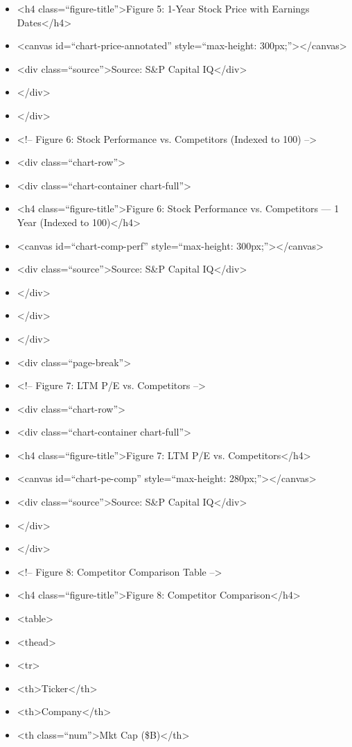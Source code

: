 \documentclass[11pt]{article}
\begin{document}
\begin{itemize}[leftmargin=*,itemsep=2pt,topsep=2pt]
\item {} <h4 class=``figure-title''>Figure 5: 1-Year Stock Price with Earnings Dates</h4>
\item {} <canvas id=``chart-price-annotated'' style=``max-height: 300px;''></canvas>
\item {} <div class=``source''>Source: S\&P Capital IQ</div>
\item {} </div>
\item {} </div>
\item {} <!-- Figure 6: Stock Performance vs. Competitors (Indexed to 100) -->
\item {} <div class=``chart-row''>
\item {} <div class=``chart-container chart-full''>
\item {} <h4 class=``figure-title''>Figure 6: Stock Performance vs. Competitors — 1 Year (Indexed to 100)</h4>
\item {} <canvas id=``chart-comp-perf'' style=``max-height: 300px;''></canvas>
\item {} <div class=``source''>Source: S\&P Capital IQ</div>
\item {} </div>
\item {} </div>
\item {} </div>
\item {} <div class=``page-break''>
\item {} <!-- Figure 7: LTM P/E vs. Competitors -->
\item {} <div class=``chart-row''>
\item {} <div class=``chart-container chart-full''>
\item {} <h4 class=``figure-title''>Figure 7: LTM P/E vs. Competitors</h4>
\item {} <canvas id=``chart-pe-comp'' style=``max-height: 280px;''></canvas>
\item {} <div class=``source''>Source: S\&P Capital IQ</div>
\item {} </div>
\item {} </div>
\item {} <!-- Figure 8: Competitor Comparison Table -->
\item {} <h4 class=``figure-title''>Figure 8: Competitor Comparison</h4>
\item {} <table>
\item {} <thead>
\item {} <tr>
\item {} <th>Ticker</th>
\item {} <th>Company</th>
\item {} <th class=``num''>Mkt Cap (\$B)</th>

\end{itemize}
\end{document}
